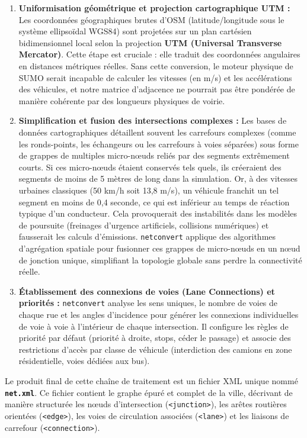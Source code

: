 \documentclass[10pt, a4paper]{article}
\begin{document}
\begin{enumerate}
\def\labelenumi{\arabic{enumi}.}
\item
  \textbf{Uniformisation géométrique et projection cartographique UTM :}
  Les coordonnées géographiques brutes d'OSM (latitude/longitude sous le
  système ellipsoïdal WGS84) sont projetées sur un plan cartésien
  bidimensionnel local selon la projection \textbf{UTM (Universal
  Transverse Mercator)}. Cette étape est cruciale : elle traduit des
  coordonnées angulaires en distances métriques réelles. Sans cette
  conversion, le moteur physique de SUMO serait incapable de calculer
  les vitesses (en m/s) et les accélérations des véhicules, et notre
  matrice d'adjacence ne pourrait pas être pondérée de manière cohérente
  par des longueurs physiques de voirie.
\item
  \textbf{Simplification et fusion des intersections complexes :} Les
  bases de données cartographiques détaillent souvent les carrefours
  complexes (comme les ronds-points, les échangeurs ou les carrefours à
  voies séparées) sous forme de grappes de multiples micro-nœuds reliés
  par des segments extrêmement courts. Si ces micro-nœuds étaient
  conservés tels quels, ils créeraient des segments de moins de 5 mètres
  de long dans la simulation. Or, à des vitesses urbaines classiques (50
  km/h soit 13,8 m/s), un véhicule franchit un tel segment en moins de
  0,4 seconde, ce qui est inférieur au temps de réaction typique d'un
  conducteur. Cela provoquerait des instabilités dans les modèles de
  poursuite (freinages d'urgence artificiels, collisions numériques) et
  fausserait les calculs d'émissions. \texttt{netconvert} applique des
  algorithmes d'agrégation spatiale pour fusionner ces grappes de
  micro-nœuds en un nœud de jonction unique, simplifiant la topologie
  globale sans perdre la connectivité réelle.
\item
  \textbf{Établissement des connexions de voies (Lane Connections) et
  priorités :} \texttt{netconvert} analyse les sens uniques, le nombre
  de voies de chaque rue et les angles d'incidence pour générer les
  connexions individuelles de voie à voie à l'intérieur de chaque
  intersection. Il configure les règles de priorité par défaut (priorité
  à droite, stops, céder le passage) et associe des restrictions d'accès
  par classe de véhicule (interdiction des camions en zone
  résidentielle, voies dédiées aux bus).
\end{enumerate}

Le produit final de cette chaîne de traitement est un fichier XML unique
nommé \textbf{\texttt{net.xml}}. Ce fichier contient le graphe épuré et
complet de la ville, décrivant de manière structurée les nœuds
d'intersection (\texttt{\textless{}junction\textgreater{}}), les arêtes
routières orientées (\texttt{\textless{}edge\textgreater{}}), les voies
de circulation associées (\texttt{\textless{}lane\textgreater{}}) et les
liaisons de carrefour (\texttt{\textless{}connection\textgreater{}}).
\end{document}
